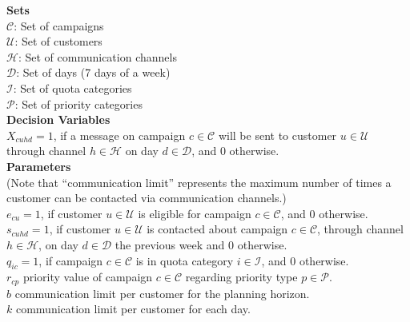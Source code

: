 \documentclass[11pt]{article}
\begin{document}
\begin{singlespace}
\noindent \textbf{Sets}\\

\noindent ${\mathcal{C}}$: Set of campaigns \\
\noindent ${\mathcal{U}}$: Set of customers \\
\noindent ${\mathcal{H}}$: Set of communication channels \\
\noindent ${\mathcal{D}}$: Set of days (7 days of a week) \\
\noindent ${\mathcal{I}}$: Set of quota categories \\
\noindent ${\mathcal{P}}$: Set of priority categories \\


\noindent \textbf{Decision Variables}\\

\noindent $X_{{c}{u}{h}{d}}=1$, if a message on campaign $c \in \mathcal{C}$ will be sent to customer $u \in \mathcal{U}$ through channel $h \in \mathcal{H}$ on day $d \in \mathcal{D}$, and 0 otherwise.\\

\noindent \textbf{Parameters}\\

\noindent (Note that ``communication limit'' represents the maximum number of times a customer can be contacted via communication channels.) \\

\noindent $e_{{c}{u}}=1$, if customer $u \in \mathcal{U}$ is eligible for campaign $c \in \mathcal{C}$, and 0 otherwise.\\

\noindent $s_{{c}{u}{h}{d}}=1$, if customer $u \in \mathcal{U}$ is contacted about campaign $c \in \mathcal{C}$, through channel $h \in \mathcal{H}$, on day $d \in \mathcal{D}$ the previous week and 0 otherwise.\\

\noindent $q_{{i}{c}}=1$, if campaign $c \in \mathcal{C}$ is in quota category $i \in \mathcal{I}$, and 0 otherwise.\\

\noindent $r_{{c}{p}}$ priority value of campaign $c \in \mathcal{C}$ regarding priority type $p \in \mathcal{P}$.\\

\noindent $b$ communication limit per customer for the planning horizon.\\

\noindent $k$ communication limit per customer for each day.\\


\end{singlespace}
\end{document}

